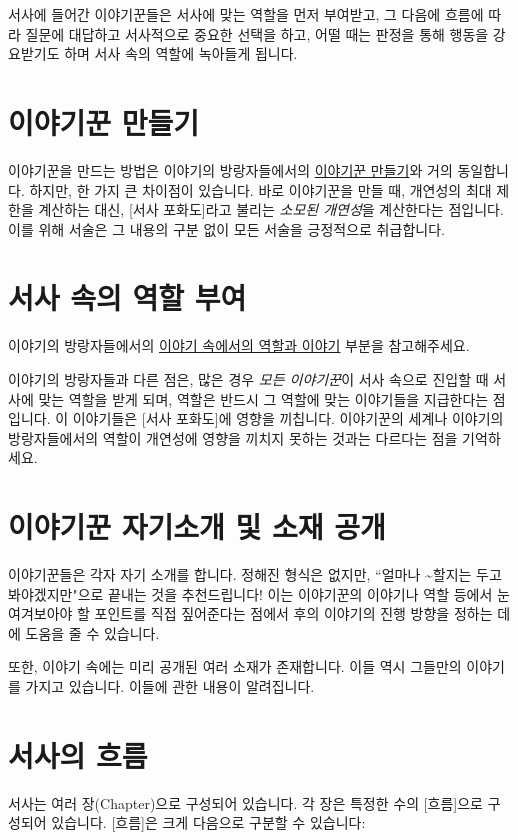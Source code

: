 \documentclass{report}
\begin{document}
	서사에 들어간 이야기꾼들은 서사에 맞는 역할을 먼저 부여받고, 그 다음에 흐름에 따라 질문에 대답하고 서사적으로 중요한 선택을 하고, 어떨 때는 판정을 통해 행동을 강요받기도 하며 서사 속의 역할에 녹아들게 됩니다.
	
	\section{이야기꾼 만들기}
		이야기꾼을 만드는 방법은 이야기의 방랑자들에서의 \hyperlink{lite-character-creation}{이야기꾼 만들기}와 거의 동일합니다. 하지만, 한 가지 큰 차이점이 있습니다. 바로 이야기꾼을 만들 때, 개연성의 최대 제한을 계산하는 대신, [서사 포화도]라고 불리는 \emph{소모된 개연성}을 계산한다는 점입니다. 이를 위해 서술은 그 내용의 구분 없이 모든 서술을 긍정적으로 취급합니다.
	
	\section{서사 속의 역할 부여}
		이야기의 방랑자들에서의 \hyperlink{lite-roles}{이야기 속에서의 역할과 이야기} 부분을 참고해주세요.
		
		이야기의 방랑자들과 다른 점은, 많은 경우 \emph{모든 이야기꾼}이 서사 속으로 진입할 때 서사에 맞는 역할을 받게 되며, 역할은 반드시 그 역할에 맞는 이야기들을 지급한다는 점입니다. 이 이야기들은 [서사 포화도]에 영향을 끼칩니다. 이야기꾼의 세계나 이야기의 방랑자들에서의 역할이 개연성에 영향을 끼치지 못하는 것과는 다르다는 점을 기억하세요.
	
	\section{이야기꾼 자기소개 및 소재 공개}
		이야기꾼들은 각자 자기 소개를 합니다. 정해진 형식은 없지만, ``얼마나 \textasciitilde 할지는 두고봐야겠지만"으로 끝내는 것을 추천드립니다! 이는 이야기꾼의 이야기나 역할 등에서 눈여겨보아야 할 포인트를 직접 짚어준다는 점에서 후의 이야기의 진행 방향을 정하는 데에 도움을 줄 수 있습니다.
		
		또한, 이야기 속에는 미리 공개된 여러 소재가 존재합니다. 이들 역시 그들만의 이야기를 가지고 있습니다. 이들에 관한 내용이 알려집니다.
		
	\section{서사의 흐름}
		서사는 여러 장(Chapter)으로 구성되어 있습니다. 각 장은 특정한 수의 [흐름]으로 구성되어 있습니다. [흐름]은 크게 다음으로 구분할 수 있습니다:
		
\end{document}

